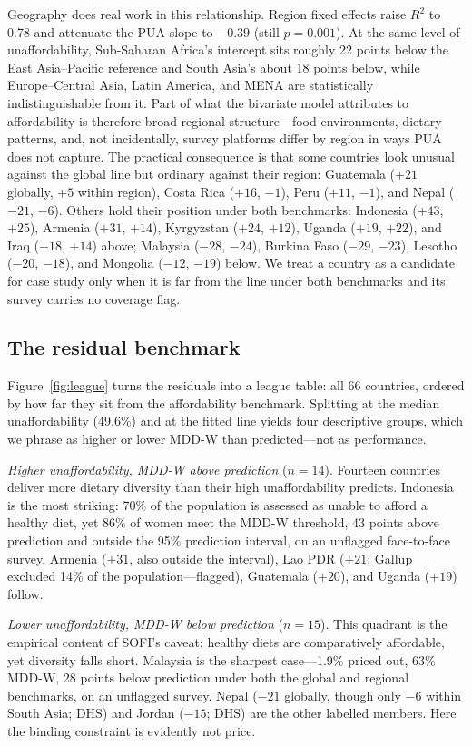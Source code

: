 \documentclass[11pt]{article}
\begin{document}
Geography does real work in this relationship. Region fixed effects raise $R^2$ to 0.78 and attenuate the PUA slope to $-0.39$ (still $p=0.001$). At the same level of unaffordability, Sub-Saharan Africa's intercept sits roughly 22 points below the East Asia--Pacific reference and South Asia's about 18 points below, while Europe--Central Asia, Latin America, and MENA are statistically indistinguishable from it. Part of what the bivariate model attributes to affordability is therefore broad regional structure---food environments, dietary patterns, and, not incidentally, survey platforms differ by region in ways PUA does not capture. The practical consequence is that some countries look unusual against the global line but ordinary against their region: Guatemala ($+21$ globally, $+5$ within region), Costa Rica ($+16$, $-1$), Peru ($+11$, $-1$), and Nepal ($-21$, $-6$). Others hold their position under both benchmarks: Indonesia ($+43$, $+25$), Armenia ($+31$, $+14$), Kyrgyzstan ($+24$, $+12$), Uganda ($+19$, $+22$), and Iraq ($+18$, $+14$) above; Malaysia ($-28$, $-24$), Burkina Faso ($-29$, $-23$), Lesotho ($-20$, $-18$), and Mongolia ($-12$, $-19$) below. We treat a country as a candidate for case study only when it is far from the line under both benchmarks and its survey carries no coverage flag.

\subsection{The residual benchmark}\label{sec:resid}

Figure~\ref{fig:league} turns the residuals into a league table: all 66 countries, ordered by how far they sit from the affordability benchmark. Splitting at the median unaffordability (49.6\%) and at the fitted line yields four descriptive groups, which we phrase as higher or lower MDD-W than predicted---not as performance.

\emph{Higher unaffordability, MDD-W above prediction} ($n=14$). Fourteen countries deliver more dietary diversity than their high unaffordability predicts. Indonesia is the most striking: 70\% of the population is assessed as unable to afford a healthy diet, yet 86\% of women meet the MDD-W threshold, 43 points above prediction and outside the 95\% prediction interval, on an unflagged face-to-face survey. Armenia ($+31$, also outside the interval), Lao PDR ($+21$; Gallup excluded 14\% of the population---flagged), Guatemala ($+20$), and Uganda ($+19$) follow.

\emph{Lower unaffordability, MDD-W below prediction} ($n=15$). This quadrant is the empirical content of SOFI's caveat: healthy diets are comparatively affordable, yet diversity falls short. Malaysia is the sharpest case---1.9\% priced out, 63\% MDD-W, 28 points below prediction under both the global and regional benchmarks, on an unflagged survey. Nepal ($-21$ globally, though only $-6$ within South Asia; DHS) and Jordan ($-15$; DHS) are the other labelled members. Here the binding constraint is evidently not price.
\end{document}
